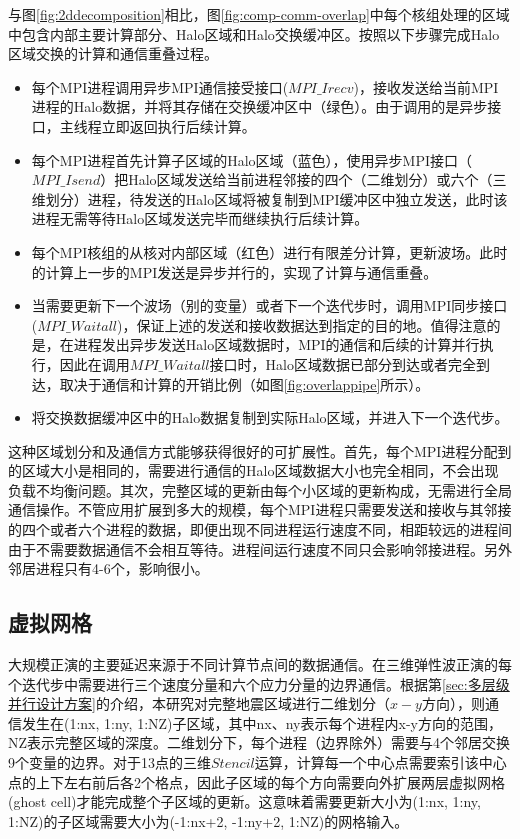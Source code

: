 与图\ref{fig:2ddecomposition}相比，图\ref{fig:comp-comm-overlap}中每个核组处理的区域中包含内部主要计算部分、Halo区域和Halo交换缓冲区。按照以下步骤完成Halo区域交换的计算和通信重叠过程。%

\begin{itemize}
  \item 每个MPI进程调用异步MPI通信接受接口($MPI\_Irecv$)，接收发送给当前MPI进程的Halo数据，并将其存储在交换缓冲区中（绿色）。由于调用的是异步接口，主线程立即返回执行后续计算。
  \item 每个MPI进程首先计算子区域的Halo区域（蓝色），使用异步MPI接口（$MPI\_Isend$）把Halo区域发送给当前进程邻接的四个（二维划分）或六个（三维划分）进程，待发送的Halo区域将被复制到MPI缓冲区中独立发送，此时该进程无需等待Halo区域发送完毕而继续执行后续计算。
  \item 每个MPI核组的从核对内部区域（红色）进行有限差分计算，更新波场。此时的计算上一步的MPI发送是异步并行的，实现了计算与通信重叠。
  \item 当需要更新下一个波场（别的变量）或者下一个迭代步时，调用MPI同步接口($MPI\_Waitall$)，保证上述的发送和接收数据达到指定的目的地。值得注意的是，在进程发出异步发送Halo区域数据时，MPI的通信和后续的计算并行执行，因此在调用$MPI\_Waitall$接口时，Halo区域数据已部分到达或者完全到达，取决于通信和计算的开销比例（如图\ref{fig:overlappipe}所示）。
  \item 将交换数据缓冲区中的Halo数据复制到实际Halo区域，并进入下一个迭代步。
\end{itemize}

这种区域划分和及通信方式能够获得很好的可扩展性。首先，每个MPI进程分配到的区域大小是相同的，需要进行通信的Halo区域数据大小也完全相同，不会出现负载不均衡问题。其次，完整区域的更新由每个小区域的更新构成，无需进行全局通信操作。不管应用扩展到多大的规模，每个MPI进程只需要发送和接收与其邻接的四个或者六个进程的数据，即便出现不同进程运行速度不同，相距较远的进程间由于不需要数据通信不会相互等待。进程间运行速度不同只会影响邻接进程。另外邻居进程只有4-6个，影响很小。

\subsection{虚拟网格}

大规模正演的主要延迟来源于不同计算节点间的数据通信。在三维弹性波正演的每个迭代步中需要进行三个速度分量和六个应力分量的边界通信。根据第\ref{sec:多层级并行设计方案}的介绍，本研究对完整地震区域进行二维划分（$x-y$方向），则通信发生在(1:nx, 1:ny, 1:NZ)子区域，其中nx、ny表示每个进程内x-y方向的范围，NZ表示完整区域的深度。二维划分下，每个进程（边界除外）需要与4个邻居交换9个变量的边界。对于13点的三维$Stencil$运算，计算每一个中心点需要索引该中心点的上下左右前后各2个格点，因此子区域的每个方向需要向外扩展两层虚拟网格(ghost cell)才能完成整个子区域的更新。这意味着需要更新大小为(1:nx, 1:ny, 1:NZ)的子区域需要大小为(-1:nx+2, -1:ny+2, 1:NZ)的网格输入。

